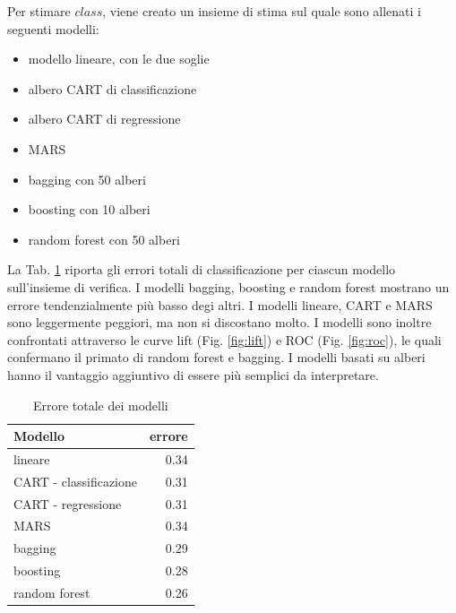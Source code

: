 \documentclass[a4paper, 10pt]{report}
\begin{document}
Per stimare $class$, viene creato un insieme di stima sul quale sono
allenati i seguenti modelli:
\begin{itemize}
  \item modello lineare, con le due soglie
  \item albero CART di classificazione
  \item albero CART di regressione
  \item MARS
  \item bagging con 50 alberi
  \item boosting con 10 alberi
  \item random forest con 50 alberi
\end{itemize}

La Tab. \ref{tab:classification-error} riporta gli errori totali di
classificazione per ciascun modello sull'insieme di verifica.  I
modelli bagging, boosting e random forest mostrano un errore
tendenzialmente più basso degi altri. I modelli lineare, CART e
MARS sono leggermente peggiori, ma non si discostano molto. I
modelli sono inoltre confrontati attraverso le curve lift (Fig.
\ref{fig:lift}) e ROC (Fig. \ref{fig:roc}), le quali confermano
il primato di random forest e bagging. I modelli basati su
alberi hanno il vantaggio aggiuntivo di essere più semplici da
interpretare.

\begin{table}
  \centering
  \begin{tabular}{|| l | r ||}
    \hline
    Modello                & errore \\
    \hline
    lineare                & 0.34   \\
    CART - classificazione & 0.31   \\
    CART - regressione     & 0.31   \\
    MARS                   & 0.34   \\
    bagging                & 0.29   \\
    boosting               & 0.28   \\
    random forest          & 0.26   \\
    \hline
  \end{tabular}
  \caption{Errore totale dei modelli}
  \label{tab:classification-error}
\end{table}
\end{document}
